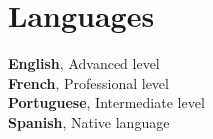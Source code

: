 		\section{Languages} 

    \textbf{English}, Advanced level            		\vspace{0mm}\\%
    \textbf{French}, Professional level		           	\vspace{0mm}\\%
	\textbf{Portuguese}, Intermediate level 	        \vspace{0mm}\\%
    \textbf{Spanish}, Native language            		\vspace{0mm}\\%
   